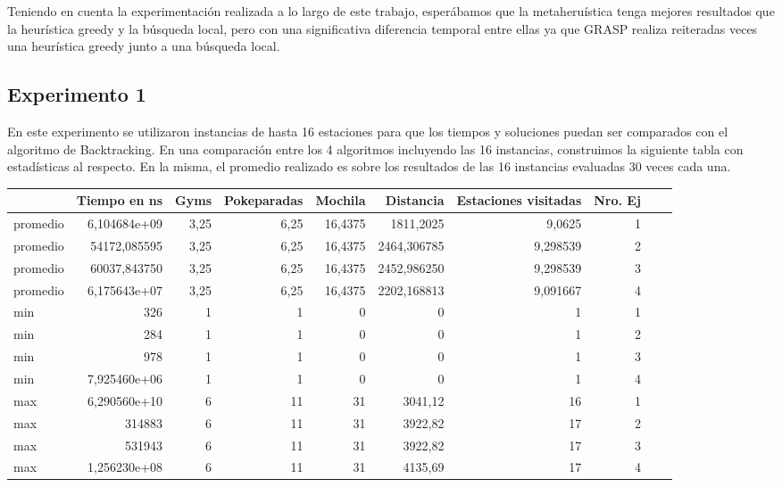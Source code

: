         Teniendo en cuenta la experimentación realizada a lo largo de este trabajo, esperábamos que la metaheruística tenga mejores resultados que la heurística greedy y la búsqueda local, pero con una significativa diferencia temporal entre ellas ya que GRASP realiza reiteradas veces una heurística greedy junto a una búsqueda local.

    \subsection{Experimento 1}
        En este experimento se utilizaron instancias de hasta 16 estaciones para que los tiempos y soluciones puedan ser comparados con el algoritmo de Backtracking.
        En una comparación entre los 4 algoritmos incluyendo las 16 instancias, construimos la siguiente tabla con estadísticas al respecto. En la misma, el promedio realizado es sobre los resultados de las 16 instancias evaluadas 30 veces cada una.

\begin{flushleft}
\begin{tabular}{l | rrrrrrrrr}
\toprule
{} &       Tiempo en ns  &       Gyms &  Pokeparadas &     Mochila &    Distancia &  Estaciones visitadas &  Nro. Ej \\
\midrule
promedio  &  6,104684e+09 &   3,25     &    6,25     &   16,4375   &  1811,2025   &            9,0625   &      1 \\
promedio  &  54172,085595 &   3,25     &    6,25     &   16,4375   &  2464,306785 &            9,298539 &      2 \\
promedio  &  60037,843750 &   3,25     &    6,25     &   16,4375   &  2452,986250 &            9,298539 &      3 \\
promedio  &  6,175643e+07 &   3,25     &    6,25     &   16,4375   &  2202,168813 &            9,091667 &      4 \\
\hline
min   &  326          &   1        &    1        &   0         &  0           &            1        &      1 \\
min   &  284          &   1        &    1        &   0         &  0           &            1        &      2 \\
min   &  978          &   1        &    1        &   0         &  0           &            1        &      3 \\
min   &  7,925460e+06 &   1        &    1        &   0         &  0           &            1        &      4 \\
\hline
max   &  6,290560e+10 &   6        &    11       &   31        &  3041,12     &            16       &      1 \\
max   &  314883       &   6        &    11       &   31        &  3922,82     &            17       &      2 \\
max   &  531943       &   6        &    11       &   31        &  3922,82     &            17       &      3 \\
max   &  1,256230e+08 &   6        &    11       &   31        &  4135,69     &            17       &      4 \\
\bottomrule
\end{tabular}      
\end{flushleft}

